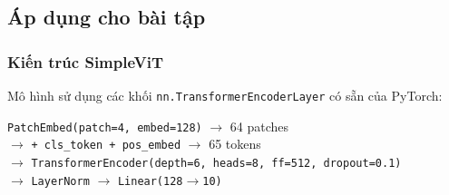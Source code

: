 \documentclass[a4paper]{article}
\newcommand{\code}[1]{\texttt{\textcolor{blue!80!black}{#1}}}
\theoremstyle{definition}
\begin{document}
\subsection{Áp dụng cho bài tập}

\subsubsection{Kiến trúc SimpleViT}
Mô hình sử dụng các khối \code{nn.TransformerEncoderLayer} có sẵn của PyTorch:

\begin{center}
\small
\texttt{PatchEmbed(patch=4, embed=128)} $\to$ 64 patches \\
$\to$ \texttt{+ cls\_token + pos\_embed} $\to$ 65 tokens \\
$\to$ \texttt{TransformerEncoder(depth=6, heads=8, ff=512, dropout=0.1)} \\
$\to$ \texttt{LayerNorm} $\to$ \texttt{Linear(128$\to$10)}
\end{center}
\end{document}
